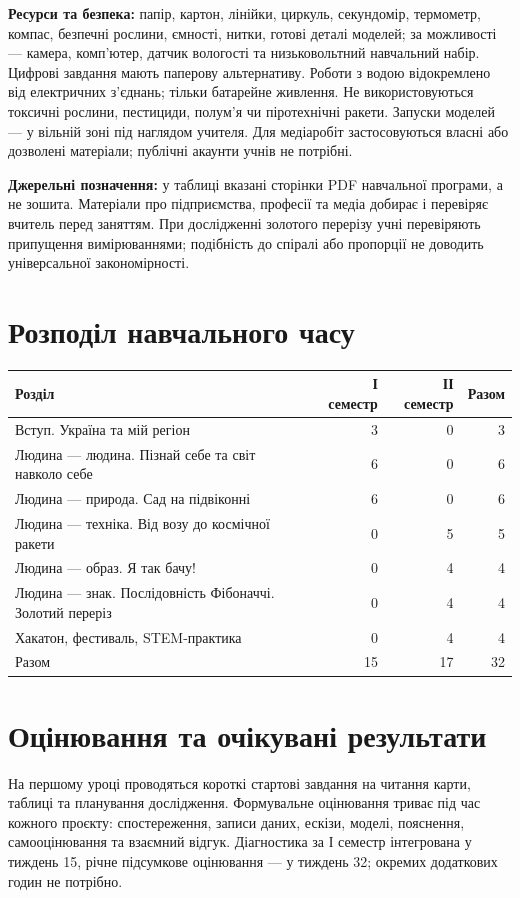 \documentclass[10pt,a4paper,landscape]{article}
\begin{document}
\textbf{Ресурси та безпека:} папір, картон, лінійки, циркуль, секундомір, термометр, компас, безпечні рослини, ємності, нитки, готові деталі моделей; за можливості — камера, комп’ютер, датчик вологості та низьковольтний навчальний набір. Цифрові завдання мають паперову альтернативу. Роботи з водою відокремлено від електричних з’єднань; тільки батарейне живлення. Не використовуються токсичні рослини, пестициди, полум’я чи піротехнічні ракети. Запуски моделей — у вільній зоні під наглядом учителя. Для медіаробіт застосовуються власні або дозволені матеріали; публічні акаунти учнів не потрібні.

\textbf{Джерельні позначення:} у таблиці вказані сторінки PDF навчальної програми, а не зошита. Матеріали про підприємства, професії та медіа добирає і перевіряє вчитель перед заняттям. При дослідженні золотого перерізу учні перевіряють припущення вимірюваннями; подібність до спіралі або пропорції не доводить універсальної закономірності.
\newpage
\section*{Розподіл навчального часу}
\begin{tabular}{P{155mm}rrr}
\toprule Розділ & І семестр & ІІ семестр & Разом \\\midrule
Вступ. Україна та мій регіон & 3 & 0 & 3 \\
Людина — людина. Пізнай себе та світ навколо себе & 6 & 0 & 6 \\
Людина — природа. Сад на підвіконні & 6 & 0 & 6 \\
Людина — техніка. Від возу до космічної ракети & 0 & 5 & 5 \\
Людина — образ. Я так бачу! & 0 & 4 & 4 \\
Людина — знак. Послідовність Фібоначчі. Золотий переріз & 0 & 4 & 4 \\
Хакатон, фестиваль, STEM-практика & 0 & 4 & 4 \\
\midrule Разом & 15 & 17 & 32 \\
\bottomrule\end{tabular}
\section*{Оцінювання та очікувані результати}
На першому уроці проводяться короткі стартові завдання на читання карти, таблиці та планування дослідження. Формувальне оцінювання триває під час кожного проєкту: спостереження, записи даних, ескізи, моделі, пояснення, самооцінювання та взаємний відгук. Діагностика за І семестр інтегрована у тиждень 15, річне підсумкове оцінювання — у тиждень 32; окремих додаткових годин не потрібно.
\end{document}
